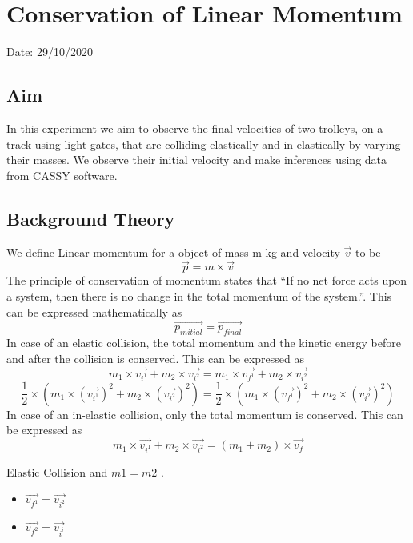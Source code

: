 \chapter{Conservation of Linear Momentum}

Date: 29/10/2020

\section{Aim}

In this experiment we aim to observe the final velocities of two trolleys, on a track using light gates, that are colliding elastically and in-elastically by varying their masses. We observe their initial velocity and make inferences using data from CASSY software. 


\section{Background Theory}

We define Linear momentum for a object of mass m kg and velocity $\vec{v}$ to be 
$$ \vec{p} = m \times \vec{v} $$
The principle of conservation of momentum states that ``If no net force acts upon a system, then there is no change in the total momentum of the system.''. This can be expressed mathematically as 
$$ \vec{p_{initial}} = \vec{p_{final}}$$
In case of an elastic collision, the total momentum and the kinetic energy before and after the collision is conserved. This can be expressed as 
$$ m_1 \times \vec{v_{i^1}} +  m_2 \times \vec{v_{i^2}} =  m_1 \times \vec{v_{f^1}} +  m_2 \times \vec{v_{i^2}}$$
$$ \frac{1}{2} \times( m_1 \times (\vec{v_{i^1}})^2 +  m_2 \times (\vec{v_{i^2}})^2 ) =  \frac{1}{2} \times( m_1 \times (\vec{v_{f^1}})^2 +  m_2 \times (\vec{v_{i^2}})^2) $$
In case of an in-elastic collision, only the total momentum is conserved. This can be expressed as 
$$ m_1 \times \vec{v_{i^1}} +  m_2 \times \vec{v_{i^2}} =  (m_1 + m_2 ) \times\vec{v_f}$$

Elastic Collision and $m1 = m2$ . 
\begin{center}
    \begin{itemize}
        \item $ \vec{v_{f^1}} = \vec{v_{i^2}}$
        \item $ \vec{v_{f^2}} = \vec{v_{i^i}}$
    \end{itemize}
\end{center}

